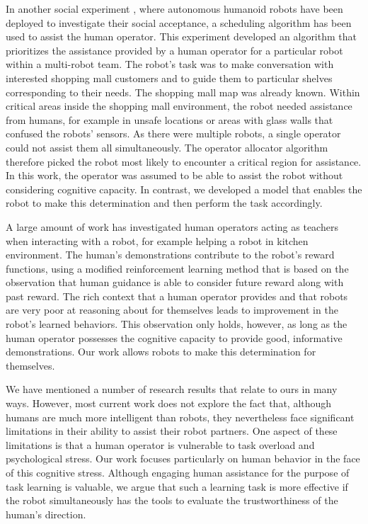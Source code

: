\documentclass{sig-alternate}
\begin{document}
In another social experiment \cite{zheng2013supervisory}, where
autonomous humanoid robots have been deployed to investigate their
social acceptance, a scheduling algorithm has been used to assist the
human operator.  This experiment developed an algorithm that
prioritizes the assistance provided by a human operator for a
particular robot within a multi-robot team. The robot's task was to
make conversation with interested shopping mall customers and to guide
them to particular shelves corresponding to their needs. The shopping
mall map was already known.  Within critical areas inside the shopping
mall environment, the robot needed assistance from humans, for example
in unsafe locations or areas with glass walls that confused the
robots' sensors.  As there were multiple robots, a single operator
could not assist them all simultaneously.  The operator allocator
algorithm therefore picked the robot most likely to encounter a
critical region for assistance. In this work, the operator was assumed
to be able to assist the robot without considering cognitive
capacity. In contrast, we developed a model that enables the robot to
make this determination and then perform the task accordingly.

A large amount of work
\cite{thomaz2006reinforcement,thomaz2008teachable} has investigated
human operators acting as teachers when interacting with a robot, for
example helping a robot in kitchen environment. The human's
demonstrations contribute to the robot's reward functions, using a
modified reinforcement learning method that is based on the
observation that human guidance is able to consider future reward
along with past reward.  The rich context that a human operator
provides and that robots are very poor at reasoning about for
themselves leads to improvement in the robot's learned behaviors.
This observation only holds, however, as long as the human operator
possesses the cognitive capacity to provide good, informative
demonstrations.  Our work allows robots to make this determination for
themselves.

We have mentioned a number of research results that relate to ours in
many ways.  However, most current work does not explore the fact that,
although humans are much more intelligent than robots, they
nevertheless face significant limitations in their ability to assist
their robot partners.  One aspect of these limitations is that a human
operator is vulnerable to task overload and psychological stress.  Our
work focuses particularly on human behavior in the face of this
cognitive stress.  Although engaging human assistance for the purpose
of task learning is valuable, we argue that such a learning task is
more effective if the robot simultaneously has the tools to evaluate
the trustworthiness of the human's direction.
\end{document}
